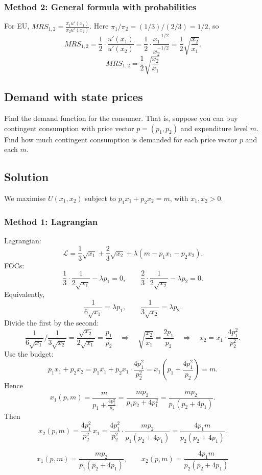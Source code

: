 \documentclass[12pt]{article}
\begin{document}
\subsubsection*{Method 2: General formula with probabilities}
For EU, \(MRS_{1,2}=\frac{\pi_1 u'(x_1)}{\pi_2 u'(x_2)}\).
Here \(\pi_1/\pi_2=(1/3)/(2/3)=1/2\), so
\[
MRS_{1,2}=\frac12\cdot\frac{u'(x_1)}{u'(x_2)}
=\frac12\cdot\frac{x_1^{-1/2}}{x_2^{-1/2}}
=\frac12\sqrt{\frac{x_2}{x_1}}.
\]
\[
\boxed{\;MRS_{1,2}=\frac12\sqrt{\frac{x_2}{x_1}}\;}
\]

\newpage
\subsection{Demand with state prices}
Find the demand function for the consumer. That is, suppose you can buy contingent
consumption with price vector \(p=(p_1,p_2)\) and expenditure level \(m\). Find how much
contingent consumption is demanded for each price vector \(p\) and each \(m\).

\subsection*{Solution}
We maximise \(U(x_1,x_2)\) subject to \(p_1x_1+p_2x_2=m\), with \(x_1,x_2>0\).

\subsubsection*{Method 1: Lagrangian}
Lagrangian:
\[
\mathcal{L}=\frac13\sqrt{x_1}+\frac23\sqrt{x_2}+\lambda(m-p_1x_1-p_2x_2).
\]
FOCs:
\[
\frac{1}{3}\cdot\frac{1}{2\sqrt{x_1}}-\lambda p_1=0,\qquad
\frac{2}{3}\cdot\frac{1}{2\sqrt{x_2}}-\lambda p_2=0.
\]
Equivalently,
\[
\frac{1}{6\sqrt{x_1}}=\lambda p_1,\qquad \frac{1}{3\sqrt{x_2}}=\lambda p_2.
\]
Divide the first by the second:
\[
\frac{1}{6\sqrt{x_1}}\Big/\frac{1}{3\sqrt{x_2}}=\frac{\sqrt{x_2}}{2\sqrt{x_1}}=\frac{p_1}{p_2}
\quad\Rightarrow\quad
\sqrt{\frac{x_2}{x_1}}=\frac{2p_1}{p_2}
\quad\Rightarrow\quad
x_2=x_1\cdot \frac{4p_1^2}{p_2^2}.
\]
Use the budget:
\[
p_1x_1+p_2x_2=p_1x_1+p_2x_1\cdot\frac{4p_1^2}{p_2^2}
=x_1\left(p_1+\frac{4p_1^2}{p_2}\right)=m.
\]
Hence
\[
x_1(p,m)=\frac{m}{p_1+\frac{4p_1^2}{p_2}}
=\frac{m p_2}{p_1p_2+4p_1^2}
=\frac{m p_2}{p_1(p_2+4p_1)}.
\]
Then
\[
x_2(p,m)=\frac{4p_1^2}{p_2^2}\,x_1
=\frac{4p_1^2}{p_2^2}\cdot \frac{m p_2}{p_1(p_2+4p_1)}
=\frac{4p_1 m}{p_2(p_2+4p_1)}.
\]

\[
\boxed{\;x_1(p,m)=\frac{m p_2}{p_1(p_2+4p_1)},\qquad x_2(p,m)=\frac{4p_1 m}{p_2(p_2+4p_1)}\;}
\]
\end{document}
